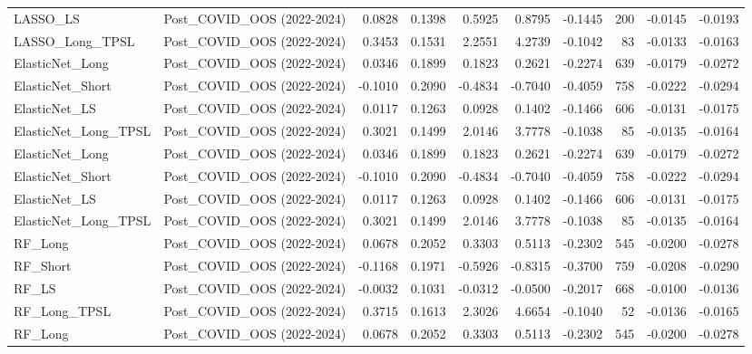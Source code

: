 \begin{tabular}{llrrrrrrrr}
LASSO\_LS & Post\_COVID\_OOS (2022-2024) & 0.0828 & 0.1398 & 0.5925 & 0.8795 & -0.1445 & 200 & -0.0145 & -0.0193 \\
\cline{1-10}
LASSO\_Long\_TPSL & Post\_COVID\_OOS (2022-2024) & 0.3453 & 0.1531 & 2.2551 & 4.2739 & -0.1042 & 83 & -0.0133 & -0.0163 \\
\cline{1-10}
ElasticNet\_Long & Post\_COVID\_OOS (2022-2024) & 0.0346 & 0.1899 & 0.1823 & 0.2621 & -0.2274 & 639 & -0.0179 & -0.0272 \\
\cline{1-10}
ElasticNet\_Short & Post\_COVID\_OOS (2022-2024) & -0.1010 & 0.2090 & -0.4834 & -0.7040 & -0.4059 & 758 & -0.0222 & -0.0294 \\
\cline{1-10}
ElasticNet\_LS & Post\_COVID\_OOS (2022-2024) & 0.0117 & 0.1263 & 0.0928 & 0.1402 & -0.1466 & 606 & -0.0131 & -0.0175 \\
\cline{1-10}
ElasticNet\_Long\_TPSL & Post\_COVID\_OOS (2022-2024) & 0.3021 & 0.1499 & 2.0146 & 3.7778 & -0.1038 & 85 & -0.0135 & -0.0164 \\
\cline{1-10}
ElasticNet\_Long & Post\_COVID\_OOS (2022-2024) & 0.0346 & 0.1899 & 0.1823 & 0.2621 & -0.2274 & 639 & -0.0179 & -0.0272 \\
\cline{1-10}
ElasticNet\_Short & Post\_COVID\_OOS (2022-2024) & -0.1010 & 0.2090 & -0.4834 & -0.7040 & -0.4059 & 758 & -0.0222 & -0.0294 \\
\cline{1-10}
ElasticNet\_LS & Post\_COVID\_OOS (2022-2024) & 0.0117 & 0.1263 & 0.0928 & 0.1402 & -0.1466 & 606 & -0.0131 & -0.0175 \\
\cline{1-10}
ElasticNet\_Long\_TPSL & Post\_COVID\_OOS (2022-2024) & 0.3021 & 0.1499 & 2.0146 & 3.7778 & -0.1038 & 85 & -0.0135 & -0.0164 \\
\cline{1-10}
RF\_Long & Post\_COVID\_OOS (2022-2024) & 0.0678 & 0.2052 & 0.3303 & 0.5113 & -0.2302 & 545 & -0.0200 & -0.0278 \\
\cline{1-10}
RF\_Short & Post\_COVID\_OOS (2022-2024) & -0.1168 & 0.1971 & -0.5926 & -0.8315 & -0.3700 & 759 & -0.0208 & -0.0290 \\
\cline{1-10}
RF\_LS & Post\_COVID\_OOS (2022-2024) & -0.0032 & 0.1031 & -0.0312 & -0.0500 & -0.2017 & 668 & -0.0100 & -0.0136 \\
\cline{1-10}
RF\_Long\_TPSL & Post\_COVID\_OOS (2022-2024) & 0.3715 & 0.1613 & 2.3026 & 4.6654 & -0.1040 & 52 & -0.0136 & -0.0165 \\
\cline{1-10}
RF\_Long & Post\_COVID\_OOS (2022-2024) & 0.0678 & 0.2052 & 0.3303 & 0.5113 & -0.2302 & 545 & -0.0200 & -0.0278 \\

\end{tabular}
